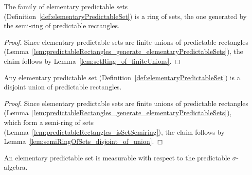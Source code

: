 \begin{lemma}\label{lem:elementaryPredictableSets_isSetRing_of}
  \leanok
  The family of elementary predictable sets (Definition~\ref{def:elementaryPredictableSet})
  is a ring of sets, the one generated by the semi-ring of predictable rectangles.
\end{lemma}

\begin{proof}\leanok
  Since elementary predictable sets are finite unions of predictable rectangles
  (Lemma~\ref{lem:predictableRectangles_generate_elementaryPredictableSets}),
  the claim follows by Lemma~\ref{lem:setRing_of_finiteUnions}.
\end{proof}

\begin{lemma}\label{lem:elementaryPredictableSets_asDisjointUnions}
  \leanok
  Any elementary predictable set (Definition~\ref{def:elementaryPredictableSet})
  is a disjoint union of predictable rectangles.
\end{lemma}

\begin{proof}\leanok
  Since elementary predictable sets are finite unions of predictable rectangles
  (Lemma~\ref{lem:predictableRectangles_generate_elementaryPredictableSets}),
  which form a semi-ring of sets (Lemma~\ref{lem:predictableRectangles_isSetSemiring}),
  the claim follows by Lemma~\ref{lem:semiRingOfSets_disjoint_of_union}.
\end{proof}

\begin{lemma}\label{lem:predictableSet_elementaryPredictableSet}
  \leanok
An elementary predictable set is measurable with respect to the predictable $\sigma$-algebra.
\end{lemma}


